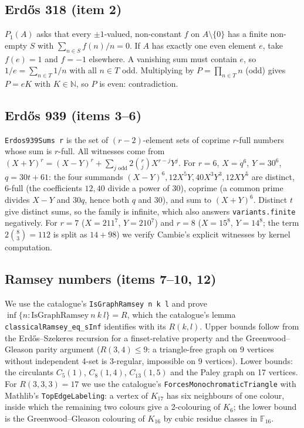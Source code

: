 \documentclass[11pt,a4paper]{article}
\newcommand{\lean}[1]{\texttt{#1}}
\begin{document}
\subsection{Erd\H{o}s 318 (item 2)}
$P_1(A)$ asks that every $\pm1$-valued, non-constant $f$ on $A\setminus\{0\}$ has a finite
non-empty $S$ with $\sum_{n\in S} f(n)/n = 0$. If $A$ has exactly one even element $e$, take
$f(e)=1$ and $f=-1$ elsewhere. A vanishing sum must contain $e$, so $1/e = \sum_{n\in T} 1/n$
with all $n\in T$ odd. Multiplying by $P=\prod_{n\in T}n$ (odd) gives $P = eK$ with $K\in\mathbb N$,
so $P$ is even: contradiction.

\subsection{Erd\H{o}s 939 (items 3--6)}
\lean{Erdos939Sums r} is the set of $(r-2)$-element sets of coprime $r$-full numbers whose sum is
$r$-full. All witnesses come from $(X+Y)^r = (X-Y)^r + \sum_{j\text{ odd}} 2\binom rj X^{r-j}Y^j$.
For $r=6$, $X=q^6$, $Y=30^6$, $q=30t+61$: the four summands
$(X-Y)^6, 12X^5Y, 40X^3Y^3, 12XY^5$ are distinct, $6$-full (the coefficients $12,40$ divide a
power of $30$), coprime (a common prime divides $X-Y$ and $30q$, hence both $q$ and $30$), and
sum to $(X+Y)^6$. Distinct $t$ give distinct sums, so the family is infinite, which also answers
\lean{variants.finite} negatively. For $r=7$ ($X=211^7$, $Y=210^7$) and $r=8$ ($X=15^8$,
$Y=14^8$; the term $2\binom 83 = 112$ is split as $14+98$) we verify Cambie's explicit witnesses by
kernel computation.

\subsection{Ramsey numbers (items 7--10, 12)}
We use the catalogue's \lean{IsGraphRamsey n k l} and prove
$\inf\{n : \mathrm{IsGraphRamsey}\ n\ k\ l\} = R$, which the catalogue's lemma
\lean{classicalRamsey\_eq\_sInf} identifies with its $R(k,l)$. Upper bounds follow from the
Erd\H{o}s--Szekeres recursion for a finset-relative property and the Greenwood--Gleason
parity argument ($R(3,4)\le 9$: a triangle-free graph on 9 vertices without independent
4-set is 3-regular, impossible on 9 vertices). Lower bounds: the circulants $C_5(1)$,
$C_8(1,4)$, $C_{13}(1,5)$ and the Paley graph on 17 vertices. For $R(3,3,3)=17$ we use the
catalogue's \lean{ForcesMonochromaticTriangle} with Mathlib's \lean{TopEdgeLabeling}: a vertex
of $K_{17}$ has six neighbours of one colour, inside which the remaining two colours give a
2-colouring of $K_6$; the lower bound is the Greenwood--Gleason colouring of $K_{16}$ by cubic
residue classes in $\mathbb F_{16}$.
\end{document}
